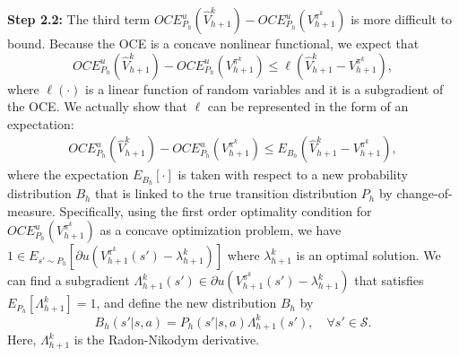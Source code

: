 \documentclass[11pt]{article}
\newcommand{\1}{\mathbbm{1}}
\begin{document}

\noindent\textbf{Step 2.2:} The third term $OCE_{P_h}^u(\hat{V}_{h+1}^k)-OCE_{P_h}^u(V^{\pi^k}_{h+1})$ is more difficult to bound. %
Because the OCE is a concave nonlinear functional, we expect that $$OCE_{P_h}^u(\hat{V}_{h+1}^k)-OCE_{P_h}^u(V^{\pi^k}_{h+1}) \le \ell ( \hat{V}_{h+1}^k - V^{\pi^k}_{h+1}),$$ where $\ell(\cdot)$ is a linear function of random variables and it is a subgradient of the OCE. We actually show that $\ell$ can be represented in the form of an expectation:
\begin{align}\label{eq:measure-change}
OCE_{P_h}^u(\hat{V}_{h+1}^k)-OCE_{P_h}^u(V^{\pi^k}_{h+1}) \le E_{B_h} ( \hat{V}_{h+1}^k - V^{\pi^k}_{h+1}),
\end{align}
where the expectation $E_{B_h}[\cdot]$ is taken with respect to a new probability distribution $B_h$ that is linked to the true transition distribution $P_h$ by change-of-measure. Specifically, 
using the first order optimality condition for $OCE^u_{P_h}(V_{h+1}^{\pi^k})$ as a concave optimization problem, we have $1\in E_{s'\sim P_h}[\partial u(V_{h+1}^{\pi^k}(s')-\lambda_{h+1}^k)]$ where $\lambda_{h+1}^k$ is an optimal solution. We can find a subgradient $\Lambda_{h+1}^k(s')\in \partial u(V_{h+1}^{\pi^k}(s')-\lambda_{h+1}^k)$ that satisfies $E_{P_h}[\Lambda_{h+1}^k]=1$, and define the new distribution $B_h$ by
$$B_h(s'|s,a)=P_h(s'|s,a)\Lambda_{h+1}^k(s'), \quad \forall s'\in\mathcal{S}.$$ Here, $\Lambda_{h+1}^k$ is the Radon-Nikodym derivative. 




\end{document}
